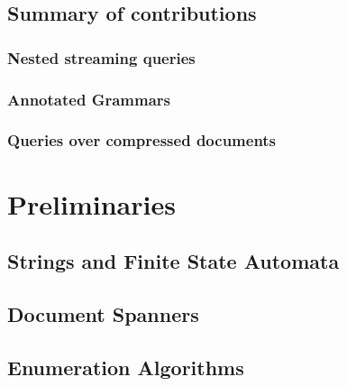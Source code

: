 \documentclass[pdftex]{pucthesis}	%
\begin{document}


\section{Summary of contributions}



\subsection{Nested streaming queries}



\subsection{Annotated Grammars}



\subsection{Queries over compressed documents}







\chapter[PRELIMINARIES]{Preliminaries}\label{chapter:prelims}



\section{Strings and Finite State Automata}



\section{Document Spanners}\label{prelims:sec:spanners}



\section{Enumeration Algorithms}\label{prelims:sec:enum}
\end{document}
